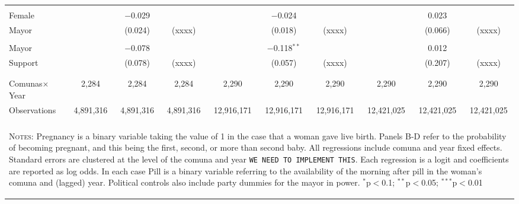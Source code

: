 \begin{landscape}
\begin{table}[!htbp]
\begin{tabular}{@{\extracolsep{5pt}}lccccccccc}
  & & & & & & & & & \\ 
 Female &  &  $-$0.029 & &  &  $-$0.024 & &  &  0.023 & \\ 
 Mayor &  &  (0.024) & (xxxx) &  &   (0.018) & (xxxx) &  &  (0.066) & (xxxx) \\ 
  & & & & & & & & & \\ 
 Mayor   &  & $-$0.078 &  &  & $-$0.118$^{**}$ &  &  & 0.012 & \\ 
 Support    &  & (0.078) & (xxxx) &  & (0.057) & (xxxx) &  & (0.207) & (xxxx) \\ 
  & & & & & & & & & \\ 
\hline \\[-1.8ex] 
Comunas$\times$Year &  2,284 & 2,284 & 2,284 & 2,290 & 2,290 & 2,290 & 2,290 & 2,290 & 2,290 \\ 
Observations  & 4,891,316 & 4,891,316 & 4,891,316 & 12,916,171 & 12,916,171 & 12,916,171 & 12,421,025 & 12,421,025 & 12,421,025 \\
\hline 
\hline \\[-1.8ex]
\multicolumn{10}{p{21cm}}{\begin{footnotesize}\textsc{Notes:}  Pregnancy is a binary variable taking the value of 1 in the case that a woman gave live birth.  Panels B-D refer to the probability of becoming pregnant, and this being the first, second, or more than second baby.  All regressions include comuna and year fixed effects.  Standard errors are clustered at the level of the comuna and year \citep{Cameronetal2008} \texttt{WE NEED TO IMPLEMENT THIS}.   Each regression is a logit and coefficients are reported as log odds. In each case Pill is a binary variable referring to the availability of the morning after pill in the woman's comuna and (lagged) year.  Political controls also include party dummies for the mayor in power. 
$^{*}$p$<$0.1; $^{**}$p$<$0.05; $^{***}$p$<$0.01 \end{footnotesize}} 
\normalsize 
\end{tabular} 
\end{table} 
\end{landscape}



